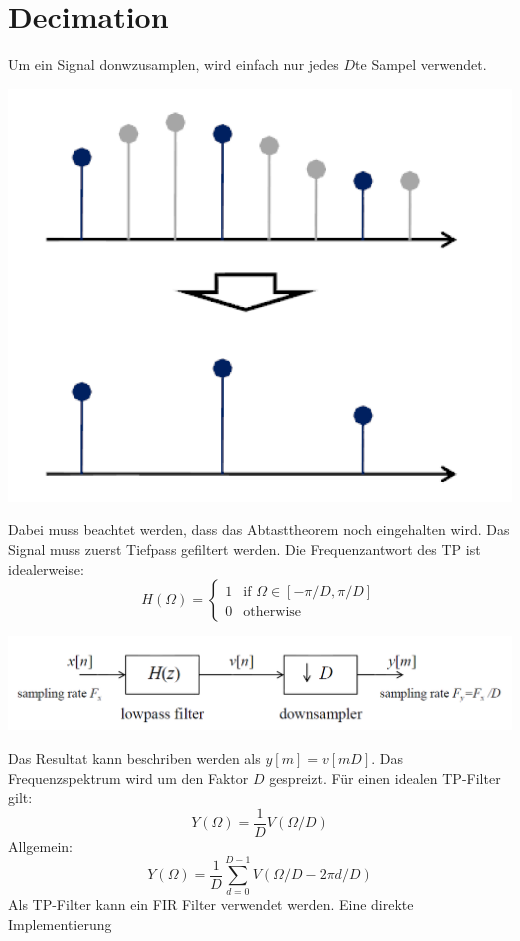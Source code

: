 \section{Decimation}
Um ein Signal donwzusamplen, wird einfach nur jedes $D$te Sampel verwendet.
\begin{center}
	\includegraphics[scale=.7]{./images/downsample}
\end{center}
Dabei muss beachtet werden, dass das Abtasttheorem noch eingehalten wird. Das
Signal muss zuerst Tiefpass gefiltert werden. Die Frequenzantwort des TP ist
idealerweise:
\[ H(\Omega) = \left\lbrace \begin{matrix}
	1 & \textrm{if } \Omega \in [-\pi/D,\pi/D]\\
	0 & \textrm{otherwise}
\end{matrix} \right. \] 
\begin{center}
	\includegraphics[scale=.7]{./images/decimation}
\end{center}
Das Resultat kann beschriben werden als $y[m] = v[mD]$. Das Frequenzspektrum
wird um den Faktor $D$ gespreizt. Für einen idealen TP-Filter gilt:
\[ Y(\Omega) = \frac{1}{D} V(\Omega/D)  \]
Allgemein:
\[ Y(\Omega) = \frac{1}{D} \sum_{d=0}^{D-1} V(\Omega/D-2\pi d/D) \]
Als TP-Filter kann ein FIR Filter verwendet werden. Eine direkte Implementierung
